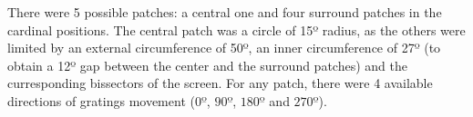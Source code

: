  \begin{table}[H]
\begin{center}\par
{}
 \caption{Configurations regarding the SM protocol stimuli properties.}
    \vspace{-5mm}
    \label{table:SM}
\end{center}
\end{table}

There were 5 possible patches: a central one and four surround patches in the cardinal positions. The central patch was a circle of 15º radius, as the others were limited by an external circumference of 50º, an inner circumference of 27º (to obtain a 12º gap between the center and the surround patches) and the curresponding bissectors of the screen. For any patch, there were 4 available directions of gratings movement ($0º$, $90º$, $180º$ and $270º$).

